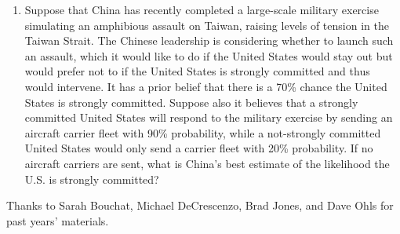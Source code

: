 \documentclass[11pt]{article}
\begin{document}
\begin{enumerate}
\item Suppose that China has recently completed a large-scale military exercise simulating an amphibious assault on Taiwan, raising levels of tension in the Taiwan Strait.  The Chinese leadership is considering whether to launch such an assault, which it would like to do if the United States would stay out but would prefer not to if the United States is strongly committed and thus would intervene.  It has a prior belief that there is a 70\% chance the United States is strongly committed.  Suppose also it believes that a strongly committed United States will respond to the military exercise by sending an aircraft carrier fleet with 90\% probability, while a not-strongly committed United States would only send a carrier fleet with 20\% probability.  If no aircraft carriers are sent, what is China's best estimate of the likelihood the U.S. is strongly committed?


\end{enumerate}

\vfill
\begin{center}
\small{Thanks to Sarah Bouchat, Michael DeCrescenzo, Brad Jones, and Dave Ohls for past years' materials.}
\end{center}
\end{document}
